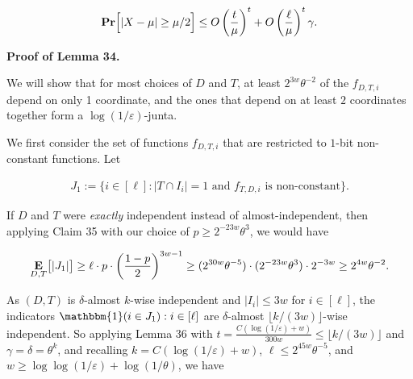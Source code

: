 \documentclass[10pt,a4paper]{article}
\begin{document}
\[\begin{gathered}
\mathop{\bf Pr\/}\Bigl{[}\lvert X-\mu\rvert\geq\mu/2\Bigr{]}\leq O\left(\frac{t}{\mu}\right)^{t}+O\left(\frac{\ell}{\mu}\right)^{t}\gamma.
\end{gathered}\]







\par\medskip\noindent\textbf{Proof of Lemma 34.}\par




We will show that for most choices of $D$ and $T$, at least $2^{3w}\theta^{-2}$ of the $f_{D,T,i}$ depend on only 1 coordinate, and the ones that depend on at least $2$ coordinates together form a $\log(1/\varepsilon)$-junta.\par




We first consider the set of functions $f_{D,T,i}$ that are restricted to $1$-bit non-constant functions.
Let\par


\[\begin{gathered}
J_{1}:=\{i\in[\ell]:\text{$\lvert T\cap I_{i}\rvert=1$ and $f_{T,D,i}$ is non-constant}\}.
\end{gathered}\]


If $D$ and $T$ were \emph{exactly} independent instead of almost-independent, then applying Claim 35 with our choice of $p\geq 2^{-23w}\theta^{3}$, we would have\par


\[\begin{gathered}
\mathop{\bf E\/}_{D,T}\bigl{[}\lvert J_{1}\rvert\bigr{]}\geq\ell\cdot p\cdot\left(\frac{1-p}{2}\right)^{3w-1}\geq(2^{30w}\theta^{-5})\cdot(2^{-23w}\theta^{3})\cdot 2^{-3w}\geq 2^{4w}\theta^{-2}.
\end{gathered}\]


As $(D,T)$ is $\delta$-almost $k$-wise independent and $\lvert I_{i}\rvert\leq 3w$ for $i\in[\ell]$, the indicators $\mathbbm{1}(i\in J_{1}):i\in[\ell]$ are $\delta$-almost $\lfloor k/(3w)\rfloor$-wise independent.
So applying Lemma 36 with $t=\frac{C(\log(1/\varepsilon)+w)}{300w}\leq\lfloor k/(3w)\rfloor$ and $\gamma=\delta=\theta^{k}$, and recalling $k=C(\log(1/\varepsilon)+w)$, $\ell\leq 2^{45w}\theta^{-5}$, and $w\geq\log\log(1/\varepsilon)+\log(1/\theta)$, we have\par
\end{document}

